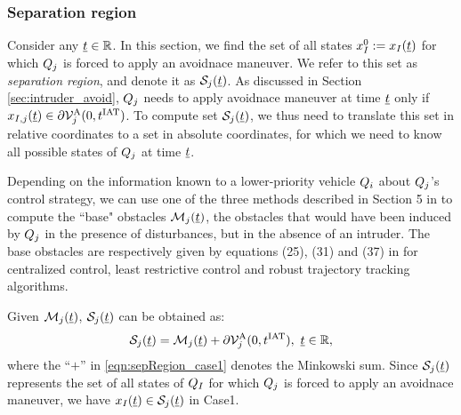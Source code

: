 \subsubsection{Separation region} \label{sec:sepRegion_case1}

Consider any $\underline{t} \in \mathbb{R}$. In this section, we find the set of all states $x_{I}^0 := x_{I}(\underline{t})$ for which $Q_j$ is forced to apply an avoidnace maneuver. We refer to this set as \textit{separation region}, and denote it as $\mathcal{S}_j(\underline{t})$. As discussed in Section \ref{sec:intruder_avoid}, $Q_j$ needs to apply avoidnace maneuver at time $\underline{t}$ only if $x_{I, j}(\underline{t}) \in \partial \mathcal{V}^{\text{A}}_{j}(0, t^\text{IAT})$. To compute set $\mathcal{S}_j(\underline{t})$, we thus need to translate this set in relative coordinates to a set in absolute coordinates, for which we need to know all possible states of $Q_j$ at time $\underline{t}$.

Depending on the information known to a lower-priority vehicle $Q_i$ about $Q_j$'s control strategy, we can use one of the three methods described in Section 5 in \cite{chen2016robust} to compute the ``base" obstacles $\mathcal{M}_j(\underline{t})$, the obstacles that would have been induced by $Q_j$ in the presence of disturbances, but in the absence of an intruder. The base obstacles are respectively given by equations (25), (31) and (37) in \cite{chen2016robust} for centralized control, least restrictive control and robust trajectory tracking algorithms.

Given $\mathcal{M}_j(\underline{t})$, $\mathcal{S}_j(\underline{t})$ can be obtained as:
\begin{equation} \label{eqn:sepRegion_case1}
\sep_j(\tsa) = \boset_j(\tsa) + \partial \brs^{\text{A}}_{j}(0, \iat), ~\tsa \in \R,
\end{equation}
where the ``$+$'' in \eqref{eqn:sepRegion_case1} denotes the Minkowski sum. Since $\mathcal{S}_j(\underline{t})$ represents the set of all states of $Q_I$ for which $Q_j$ is forced to apply an avoidnace maneuver, we have $x_{I}(\underline{t}) \in \mathcal{S}_j(\underline{t})$ in Case1.